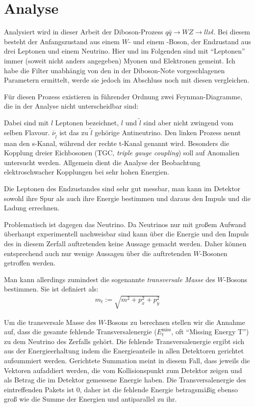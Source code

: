 \section{Analyse}
\label{cha:analyse}
Analysiert wird in dieser Arbeit der Diboson-Prozess $q\bar{q}\to WZ\to ll\nu
l$. Bei diesem besteht der Anfangszustand aus einem $W$- und einem \Z-Boson, der
Endzustand aus drei Leptonen und einem Neutrino.  Hier und im Folgenden sind mit
"`Leptonen"' immer (soweit nicht anders angegeben) Myonen und Elektronen
gemeint. Ich habe die Filter unabhängig von den in der Diboson-Note
vorgeschlagenen Parametern\cite{diboson-ana} ermittelt, werde sie jedoch im
Abschluss noch mit diesen vergleichen.

Für diesen Prozess existieren in führender Ordnung zwei Feynman-Diagramme, die
in der Analyse nicht unterscheidbar sind: \\
\begin{center}
   \hspace{2cm}
  
\end{center}

Dabei sind mit $l$ Leptonen bezeichnet, $l$ und $\tilde l$ sind aber nicht
zwingend vom selben Flavour. $\bar \nu_{\tilde l}$ ist das zu $\tilde l$
gehörige Antineutrino. Den linken Prozess nennt man den s-Kanal, während der
rechte t-Kanal genannt wird. Besonders die Kopplung dreier Eichbosonen (TGC,
\emph{triple gauge coupling}) soll auf Anomalien untersucht werden.  Allgemein
dient die Analyse der Beobachtung elektroschwacher Kopplungen bei sehr hohen
Energien.

Die Leptonen des Endzustandes sind sehr gut messbar, man kann im Detektor sowohl
ihre Spur als auch ihre Energie bestimmen und daraus den Impuls und die Ladung
errechnen.

Problematisch ist dagegen das Neutrino. Da Neutrinos nur mit großem Aufwand
überhaupt experimentell nachweisbar sind kann über die Energie und den Impuls
des in diesem Zerfall auftretenden keine Aussage gemacht werden.  Daher können
entsprechend auch nur wenige Aussagen über die auftretenden $W$-Bosonen
getroffen werden.

\label{cha:met}
Man kann allerdings zumindest die sogenannte \emph{transversale Masse} des
$W$-Bosons bestimmen. Sie ist definiert als:
\begin{align}
  m_t := \sqrt{m^2 + p_x^2 + p_y^2}
  \label{def:trans}
\end{align}

Um die transversale Masse des $W$-Bosons zu berechnen stellen wir die Annahme auf,
dass die gesamte fehlende Transversalenergie ($E_t^\text{miss}$, oft "`Missing
Energy T"') zu dem Neutrino des Zerfalls gehört. Die fehlende Transversalenergie
ergibt sich aus der Energieerhaltung indem die Energieanteile in allen
Detektoren gerichtet aufsummiert werden. Gerichtete Summation meint in diesem
Fall, dass jeweils die Vektoren aufaddiert werden, die vom Kollisionspunkt zum
Detektor zeigen und als Betrag die im Detektor gemessene Energie haben. Die
Transversalenergie des eintreffenden Pakets ist $0$, daher ist die fehlende
Energie betragsmäßig ebenso groß wie die Summe der Energien und antiparallel zu
ihr.

